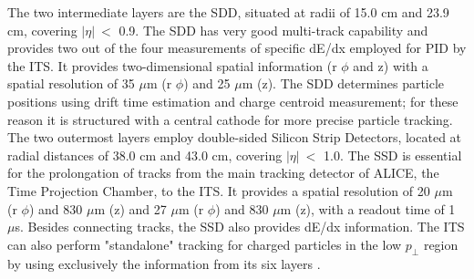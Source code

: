 \documentclass[12pt,a4paper]{book}
\begin{document}
The two intermediate layers are the SDD, situated at radii of 15.0 cm and 23.9 cm, covering $|\eta|\ <$ 0.9. The SDD has very good multi-track capability and provides two out of the four measurements of specific dE/dx employed for PID by the ITS. It provides two-dimensional spatial information (r $\phi$ and z) with a spatial resolution of 35 $\mu$m (r $\phi$) and 25 $\mu$m (z). The SDD determines particle positions using drift time estimation and charge centroid measurement; for these reason it is structured with a central cathode for more precise particle tracking.
The two outermost layers employ double-sided Silicon Strip Detectors, located at radial distances of 38.0 cm and 43.0 cm, covering $|\eta|\ <$ 1.0. The SSD is essential for the prolongation of tracks from the main tracking detector of ALICE, the Time Projection Chamber, to the ITS. It provides a spatial resolution of 20 $\mu$m (r $\phi$) and 830 $\mu$m (z) and 27 $\mu$m (r $\phi$) and 830 $\mu$m (z), with a readout time of 1 $\mu$s. Besides connecting tracks, the SSD also provides dE/dx information. The ITS can also perform "standalone" tracking for charged particles in the low $p_\perp$ region by using exclusively the information from its six layers 
	\cite{Padhan:2924203} \cite{amsdottorato9036} \cite{Cheng:2908766} \cite{Arata:2922803}.
	
\end{document}
